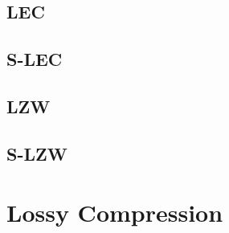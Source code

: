 \subsection{LEC}
\subsection{S-LEC}

\subsection{LZW}
\subsection{S-LZW}



\section{Lossy Compression}
